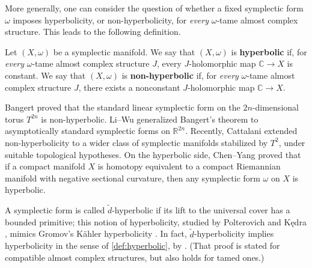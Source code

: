 \documentclass[11pt,twoside]{amsart}
\newcommand{\R}{\mathbb{R}}
\newcommand{\C}{\mathbb{C}}
\renewcommand{\tilde}{\widetilde}
\begin{document}
 More generally, one can consider the question of whether a fixed symplectic form $\omega$ imposes hyperbolicity, or non-hyperbolicity, for \emph{every} $\omega$-tame almost complex structure. This leads to the following definition.

\begin{definition}\label{def:hyperbolic}
Let \((X,\omega)\) be a symplectic manifold.
We say that \((X,\omega)\) is {\bf hyperbolic} if, for \emph{every}
\(\omega\)-tame almost complex structure \(J\), every \(J\)-holomorphic
map
\(
\C\to X
\)
is constant.
We say that \((X,\omega)\) is {\bf non-hyperbolic} if, for \emph{every}
\(\omega\)-tame almost complex structure \(J\), there exists a
nonconstant \(J\)-holomorphic map
\(
 \C\to X
\).
\end{definition}

Bangert \cite{Bangert1998Existence} proved that the standard linear symplectic form on the $2n$-dimensional torus $T^{2n}$ is non-hyperbolic. 
Li--Wu \cite{LiWu2012Note} generalized Bangert's theorem to asymptotically standard symplectic forms on $\R^{2n}$.
Recently, Cattalani \cite{spencerhyperbolic} extended non-hyperbolicity to a wider class of symplectic manifolds stabilized by $T^2$, under suitable topological hypotheses. On the hyperbolic side, Chen--Yang \cite{ChenYang} proved that if a compact manifold $X$ is homotopy equivalent to a compact Riemannian manifold with negative sectional curvature, then any symplectic form $\omega$ on $X$ is hyperbolic. 



\begin{remark}

A symplectic form is called $\tilde d$-hyperbolic if its lift to the universal cover has a bounded primitive; this notion of hyperbolicity, studied by Polterovich \cite{Polterovichhyperbolic} and K\k{e}dra \cite{Kedrahyperbolic}, mimics Gromov's K\"ahler hyperbolicity \cite{Gromovhyperbolic}.
In fact, $\tilde d$-hyperbolicity implies hyperbolicity in the sense of \autoref{def:hyperbolic}, by \cite[Theorem 4.1]{ChenYang}. (That proof is stated for compatible almost complex structures, but also holds for tamed ones.) 
\end{remark}
\end{document}
